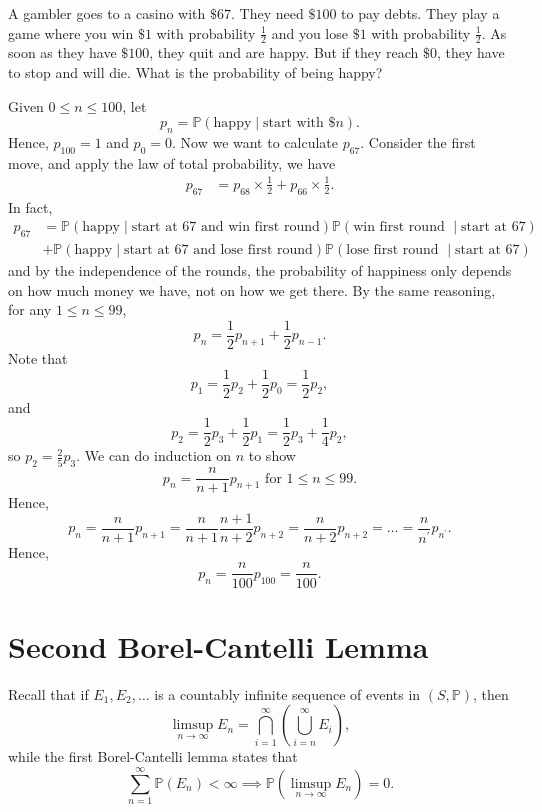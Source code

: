 \begin{eg}
    A gambler goes to a casino with \(\$ 67\). They need \(\$ 100\) to pay debts. They play a game where you win \(\$ 1\) with probability \(\frac{1}{2}\) and you lose \(\$ 1\) with probability \(\frac{1}{2}\). As soon as they have \(\$ 100\), they quit and are happy. But if they reach \(\$ 0\), they have to stop and will die. What is the probability of being happy?        
\end{eg}
\begin{explanation}
    Given \(0 \le n \le 100\), let 
    \[
        p_n = \mathbb{P} (\text{happy} \mid \text{start with } \$ n).
    \] 
    Hence, \(p_{100} = 1\) and \(p_0 = 0\). Now we want to calculate \(p_{67} \). Consider the first move, and apply the law of total probability, we have 
    \begin{align*}
        p_{67} &= p_{68} \times \frac{1}{2} + p_{66} \times \frac{1}{2}.
    \end{align*}   
    In fact,
    \begin{align*}
        p_{67} &= \mathbb{P} (\text{happy} \mid \text{start at } 67 \text{ and win first round}) \mathbb{P} (\text{win first round } \mid \text{start at } 67) \\ &+ \mathbb{P} (\text{happy} \mid \text{start at } 67 \text{ and lose first round}) \mathbb{P} (\text{lose first round } \mid \text{start at } 67) 
    \end{align*}
    and by the independence of the rounds, the probability of happiness only depends on how much money we have, not on how we get there. By the same reasoning, for any \(1 \le n \le 99\), 
    \[
        p_n = \frac{1}{2} p_{n+1} + \frac{1}{2} p_{n-1}.
    \] 
    Note that 
    \[
        p_1 = \frac{1}{2} p_2 + \frac{1}{2} p_0 = \frac{1}{2} p_2,
    \]
    and 
    \[
        p_2 = \frac{1}{2} p_3 + \frac{1}{2} p_1 = \frac{1}{2} p_3 + \frac{1}{4} p_2,
    \]
    so \(p_2 = \frac{2}{5} p_3\). We can do induction on \(n\) to show
    \[
        p_n = \frac{n}{n + 1} p_{n+1} \text{ for } 1 \le n \le 99. 
    \]
    Hence,
    \[
        p_n = \frac{n}{n+1} p_{n+1} = \frac{n}{n+1} \frac{n+1}{n+2} p_{n+2} = \frac{n}{n+2} p_{n+2} = \dots = \frac{n}{n^{\prime} } p_{n^{\prime} }.
    \]  
    Hence, 
    \[
        p_n = \frac{n}{100} p_{100} = \frac{n}{100}. 
    \]
\end{explanation}

\section{Second Borel-Cantelli Lemma}
Recall that if \(E_1, E_2, \dots \) is a countably infinite sequence of events in \((S, \mathbb{P})\), then 
\[
    \limsup_{n \to \infty} E_n = \bigcap_{i=1}^{\infty} \left( \bigcup_{i=n}^{\infty} E_i \right),   
\]  
while the first Borel-Cantelli lemma states that 
\[
    \sum_{n=1}^{\infty} \mathbb{P} (E_n) < \infty \implies \mathbb{P} (\limsup_{n \to \infty} E_n ) = 0. 
\]

